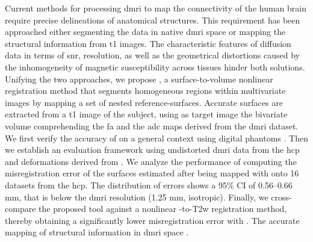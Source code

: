 Current methods for processing \gls*{dmri} to map the connectivity of the human brain
  require precise delineations of anatomical structures.
This requirement has been approached  either segmenting the data in
  native \gls*{dmri} space or mapping the structural information from \gls*{t1} images.
The characteristic features of diffusion data in terms of \acrlong*{snr}, resolution, as well
  as the geometrical distortions caused by the inhomogeneity of magnetic susceptibility
  across tissues hinder both solutions.
Unifying the two approaches, we propose \regseg{}, a surface-to-volume nonlinear
  registration method that segments homogeneous regions within multivariate images by mapping
  a set of nested reference-surfaces.
Accurate surfaces are extracted from a \gls*{t1} image of the subject, using as target image
  the bivariate volume comprehending the \gls*{fa} and the \gls*{adc} maps derived from the
  \gls*{dmri} dataset.
We first verify the accuracy of \regseg{} on a general context using digital phantoms 
  .
Then we establish an evaluation framework using undistorted \gls*{dmri} data from the \gls*{hcp}
  and  deformations derived from 
  .
We analyze the performance of \regseg{} computing the misregistration error of the surfaces estimated
  after being mapped with \regseg{} onto 16 datasets from the \gls*{hcp}.
The distribution of errors shows a 95\% CI of 0.56--0.66 mm, that is below the \gls*{dmri}
  resolution (1.25 mm, isotropic).
Finally, we cross-compare the proposed tool against a nonlinear \lowb{}-to-T2w registration
  method, thereby obtaining a significantly lower misregistration error with \regseg{}.
The accurate mapping of structural information in \gls*{dmri} space 
  .